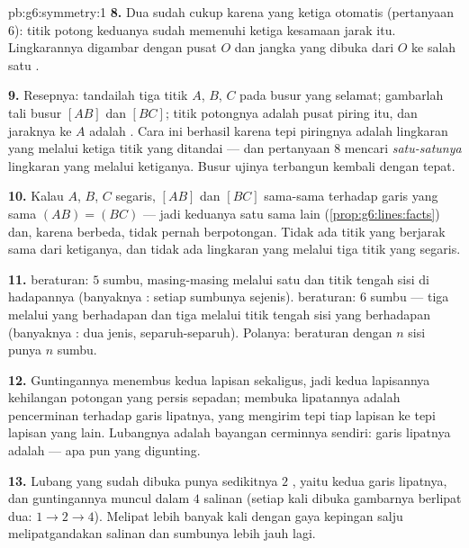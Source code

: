\begin{solution}{pb:g6:symmetry:1}
\textbf{8.} Dua  sudah cukup karena yang ketiga otomatis
(pertanyaan 6): titik potong keduanya sudah memenuhi ketiga kesamaan
jarak itu. Lingkarannya digambar dengan pusat $O$ dan jangka yang
dibuka dari $O$ ke salah satu .

\textbf{9.} Resepnya: tandailah tiga titik $A$, $B$, $C$ pada busur
yang selamat; gambarlah  tali busur $[AB]$ dan $[BC]$;
titik potongnya adalah pusat piring itu, dan jaraknya ke $A$ adalah
. Cara ini berhasil karena tepi piringnya adalah lingkaran
yang melalui ketiga titik yang ditandai --- dan pertanyaan 8 mencari
\emph{satu-satunya} lingkaran yang melalui ketiganya. Busur ujinya terbangun
kembali dengan tepat.

\textbf{10.} Kalau $A$, $B$, $C$ segaris,  $[AB]$ dan
 $[BC]$ sama-sama  terhadap garis yang sama
$(AB) = (BC)$ --- jadi keduanya  satu sama lain
(\cref{prop:g6:lines:facts}) dan, karena berbeda, tidak pernah
berpotongan. Tidak ada titik yang berjarak sama dari ketiganya, dan
tidak ada lingkaran yang melalui tiga titik yang segaris.

\textbf{11.}  beraturan: $5$ sumbu, masing-masing melalui
satu  dan titik tengah sisi di hadapannya (banyaknya
: setiap sumbunya sejenis).  beraturan: $6$ sumbu ---
tiga melalui  yang berhadapan dan tiga melalui titik tengah
sisi yang berhadapan (banyaknya : dua jenis, separuh-separuh).
Polanya:  beraturan dengan $n$ sisi punya $n$ sumbu.

\textbf{12.} Guntingannya menembus kedua lapisan sekaligus, jadi kedua
lapisannya kehilangan potongan yang persis sepadan; membuka lipatannya
adalah pencerminan terhadap garis lipatnya, yang mengirim tepi tiap
lapisan ke tepi lapisan yang lain. Lubangnya adalah bayangan cerminnya
sendiri: garis lipatnya adalah  --- apa pun yang digunting.

\textbf{13.} Lubang yang sudah dibuka punya sedikitnya $2$ , yaitu kedua garis lipatnya, dan guntingannya muncul dalam $4$
salinan (setiap kali dibuka gambarnya berlipat dua: $1 \to 2 \to 4$).
Melipat lebih banyak kali dengan gaya kepingan salju melipatgandakan
salinan dan sumbunya lebih jauh lagi.


\end{solution}

